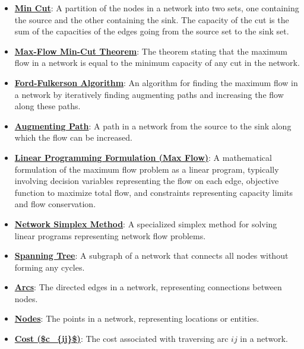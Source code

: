 \documentclass{article}%
\begin{document}
\begin{itemize}[leftmargin=*]
\item \href{https://www.math.purdue.edu/~yipn/421/2024-11-19-MaxFlowMinCut.pdf#page=2}{\textbf{Min Cut}}: A partition of the nodes in a network into two sets, one containing the source and the other containing the sink. The capacity of the cut is the sum of the capacities of the edges going from the source set to the sink set. %
\item \href{https://www.math.purdue.edu/~yipn/421/2024-11-19-MaxFlowMinCut.pdf#page=4}{\textbf{Max{-}Flow Min{-}Cut Theorem}}: The theorem stating that the maximum flow in a network is equal to the minimum capacity of any cut in the network. %
\item \href{https://www.math.purdue.edu/~yipn/421/2024-11-19-MaxFlowMinCut.pdf#page=10}{\textbf{Ford{-}Fulkerson Algorithm}}: An algorithm for finding the maximum flow in a network by iteratively finding augmenting paths and increasing the flow along these paths. %
\item \href{https://www.math.purdue.edu/~yipn/421/2024-11-19-MaxFlowMinCut.pdf#page=10}{\textbf{Augmenting Path}}: A path in a network from the source to the sink along which the flow can be increased. %
\item \href{https://www.math.purdue.edu/~yipn/421/2024-11-19-MaxFlowMinCut.pdf#page=14}{\textbf{Linear Programming Formulation (Max Flow)}}: A mathematical formulation of the maximum flow problem as a linear program, typically involving decision variables representing the flow on each edge, objective function to maximize total flow, and constraints representing capacity limits and flow conservation. %
\item \href{https://www.math.purdue.edu/~yipn/421/2024-11-21-EconNetSimplex.pdf#page=1}{\textbf{Network Simplex Method}}: A specialized simplex method for solving linear programs representing network flow problems. %
\item \href{https://www.math.purdue.edu/~yipn/421/2024-11-21-EconNetSimplex.pdf#page=2}{\textbf{Spanning Tree}}: A subgraph of a network that connects all nodes without forming any cycles. %
\item \href{https://www.math.purdue.edu/~yipn/421/2024-11-21-EconNetSimplex.pdf#page=1}{\textbf{Arcs}}: The directed edges in a network, representing connections between nodes. %
\item \href{https://www.math.purdue.edu/~yipn/421/2024-11-21-EconNetSimplex.pdf#page=1}{\textbf{Nodes}}: The points in a network, representing locations or entities. %
\item \href{https://www.math.purdue.edu/~yipn/421/2024-11-21-EconNetSimplex.pdf#page=1}{\textbf{Cost (\$c\_\{ij\}\$)}}: The cost associated with traversing arc $ij$ in a network. %

\end{itemize}
\end{document}
